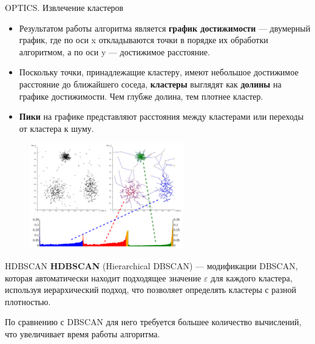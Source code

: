 \documentclass[unicode, notheorems, handout]{beamer}
\begin{document}
\begin{frame}{OPTICS. Извлечение кластеров}
\scriptsize
\begin{itemize}
    \item Результатом работы алгоритма является \textbf{график достижимости} --- двумерный график, где по оси x откладываются точки в порядке их обработки алгоритмом, а по оси y --- достижимое расстояние. 

    \item Поскольку точки, принадлежащие кластеру, имеют небольшое достижимое расстояние до ближайшего соседа, \textbf{кластеры} выглядят как \textbf{долины} на графике достижимости. Чем глубже долина, тем плотнее кластер.
    
    \item \textbf{Пики} на графике представляют расстояния между кластерами или переходы от кластера к шуму.
\end{itemize}

         \begin{figure}[h]
        \centering
        \includegraphics[width=0.6\textwidth]{optics.png} 
    \end{figure}
\end{frame}

\begin{frame}{HDBSCAN}
    \textbf{HDBSCAN} (Hierarchical DBSCAN) --- модификации DBSCAN, которая автоматически находит подходящее значение $\varepsilon$ для каждого кластера, используя иерархический подход, что позволяет определять кластеры с разной плотностью.
    \vspace{1ex}
    
    По сравнению с DBSCAN  для него требуется большее количество вычислений, что увеличивает время работы алгоритма.
\end{frame}
\end{document}
